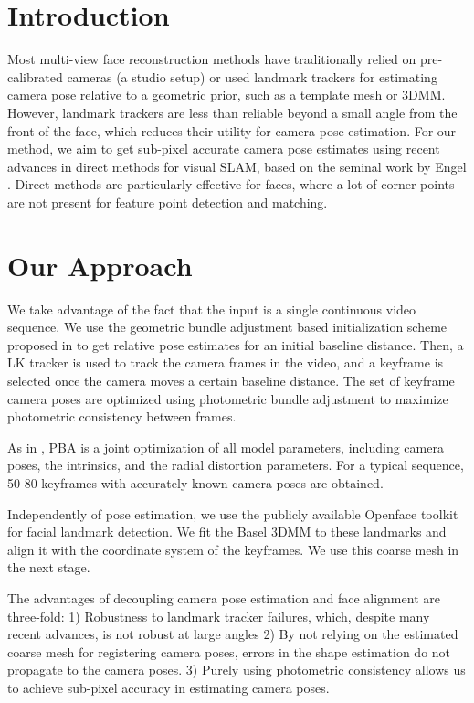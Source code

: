
\section{Introduction}
Most multi-view face reconstruction methods have traditionally relied on pre-calibrated cameras (a studio setup) or used landmark trackers for estimating camera pose relative to a geometric prior, such as a template mesh or 3DMM. However, landmark trackers are less than reliable beyond a small angle from the front of the face, which reduces their utility for camera pose estimation. For our method, we aim to get sub-pixel accurate camera pose estimates using recent advances in direct methods for visual SLAM, based on the seminal work by Engel \etal \cite{engel2018direct,engel2014lsd}. Direct methods are particularly effective for faces, where a lot of corner points are not present for feature point detection and matching.

\section{Our Approach}
We take advantage of the fact that the input is a single continuous video sequence. We use the geometric bundle adjustment based initialization scheme proposed in \cite{ham2017monocular} to get relative pose estimates for an initial baseline distance. Then, a LK tracker is used to track the camera frames in the video, and a keyframe is selected once the camera moves a certain baseline distance. The set of keyframe camera poses are optimized using photometric bundle adjustment to maximize photometric consistency between frames.

As in \cite{engel2018direct}, PBA is a joint optimization of all model parameters, including camera poses, the intrinsics, and the radial distortion parameters. For a typical sequence, 50-80 keyframes with accurately known camera poses are obtained.

Independently of pose estimation, we use the publicly available Openface toolkit \cite{baltrusaitis2018openface} for facial landmark detection. We fit the Basel 3DMM \cite{blanz1999morphable} to these landmarks and align it with the coordinate system of the keyframes. We use this coarse mesh in the next stage.

The advantages of decoupling camera pose estimation and face alignment are three-fold: 1) Robustness to landmark tracker failures, which, despite many recent advances, is not robust at large angles  2) By not relying on the estimated coarse mesh for registering camera poses, errors in the shape estimation do not propagate to the camera poses. 3) Purely using photometric consistency allows us to achieve sub-pixel accuracy in estimating camera poses. 
